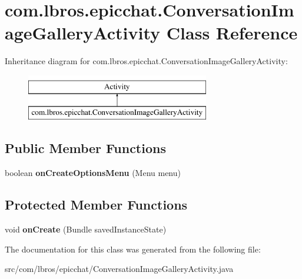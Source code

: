 \hypertarget{classcom_1_1lbros_1_1epicchat_1_1_conversation_image_gallery_activity}{\section{com.\-lbros.\-epicchat.\-Conversation\-Image\-Gallery\-Activity Class Reference}
\label{classcom_1_1lbros_1_1epicchat_1_1_conversation_image_gallery_activity}
}
Inheritance diagram for com.\-lbros.\-epicchat.\-Conversation\-Image\-Gallery\-Activity\-:\begin{figure}[H]
\begin{center}
\leavevmode
\includegraphics[height=2.000000cm]{classcom_1_1lbros_1_1epicchat_1_1_conversation_image_gallery_activity}
\end{center}
\end{figure}
\subsection*{Public Member Functions}
\begin{DoxyCompactItemize}
\item 
\hypertarget{classcom_1_1lbros_1_1epicchat_1_1_conversation_image_gallery_activity_ab1cf627a8ee6a28caef921007b6d1f1a}{boolean {\bfseries on\-Create\-Options\-Menu} (Menu menu)}\label{classcom_1_1lbros_1_1epicchat_1_1_conversation_image_gallery_activity_ab1cf627a8ee6a28caef921007b6d1f1a}

\end{DoxyCompactItemize}
\subsection*{Protected Member Functions}
\begin{DoxyCompactItemize}
\item 
\hypertarget{classcom_1_1lbros_1_1epicchat_1_1_conversation_image_gallery_activity_a8227a971c19ffbde2b0c9951d026efa9}{void {\bfseries on\-Create} (Bundle saved\-Instance\-State)}\label{classcom_1_1lbros_1_1epicchat_1_1_conversation_image_gallery_activity_a8227a971c19ffbde2b0c9951d026efa9}

\end{DoxyCompactItemize}


The documentation for this class was generated from the following file\-:\begin{DoxyCompactItemize}
\item 
src/com/lbros/epicchat/Conversation\-Image\-Gallery\-Activity.\-java\end{DoxyCompactItemize}
